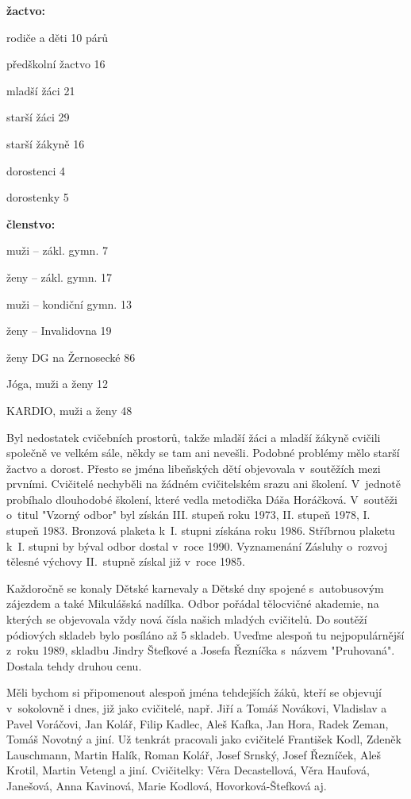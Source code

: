 \documentclass[a5paper, 11pt, twoside]{article}
\begin{document}
\medskip
\textbf{žactvo:}

rodiče a děti 10 párů

předškolní žactvo 16

mladší žáci 21

starší žáci 29

starší žákyně 16

dorostenci 4

dorostenky 5


\medskip
\textbf{členstvo:}

muži -- zákl. gymn. 7

ženy -- zákl. gymn. 17

muži -- kondiční gymn. 13

ženy -- Invalidovna 19

ženy DG na Žernosecké 86

Jóga, muži a ženy 12

KARDIO, muži a ženy 48

\medskip

\noindent
Byl nedostatek cvičebních prostorů, takže mladší žáci a mladší žákyně
cvičili společně ve velkém sále, někdy se tam ani nevešli. Podobné
problémy mělo starší žactvo a dorost. Přesto se jména libeňských dětí
objevovala v~soutěžích mezi prvními. Cvičitelé nechyběli na žádném
cvičitelském srazu ani školení. V~jednotě probíhalo dlouhodobé školení,
které vedla metodička Dáša Horáčková. V~soutěži o~titul "Vzorný odbor"
byl získán III. stupeň roku 1973, II. stupeň 1978, I. stupeň 1983.
Bronzová plaketa k~I. stupni získána roku 1986. Stříbrnou plaketu k~I.
stupni by býval odbor dostal v~roce 1990. Vyznamenání Zásluhy o~rozvoj
tělesné výchovy II.~stupně získal již v~roce 1985.

Každoročně se konaly Dětské karnevaly a Dětské dny spojené s~autobusovým
zájezdem a také Mikulášská nadílka. Odbor pořádal tělocvičné akademie,
na kterých se objevovala vždy nová čísla našich mladých cvičitelů. Do
soutěží pódiových skladeb bylo posíláno až 5 skladeb. Uveďme alespoň tu
nejpopulárnější z~roku 1989, skladbu Jindry Štefkové a Josefa Řezníčka
s~názvem "Pruhovaná". Dostala tehdy druhou cenu.

Měli bychom si připomenout alespoň jména tehdejších žáků, kteří se
objevují v~sokolovně i dnes, již jako cvičitelé, např. Jiří a Tomáš
Novákovi, Vladislav a Pavel Voráčovi, Jan Kolář, Filip Kadlec, Aleš
Kafka, Jan Hora, Radek Zeman, Tomáš Novotný a jiní. Už tenkrát pracovali
jako cvičitelé František Kodl, Zdeněk Lauschmann, Martin Halík, Roman
Kolář, Josef Srnský, Josef Řezníček, Aleš Krotil, Martin Vetengl a jiní.
Cvičitelky: Věra Decastellová, Věra Haufová, Janešová, Anna Kavinová,
Marie Kodlová, Hovorková-Štefková aj.
\end{document}
